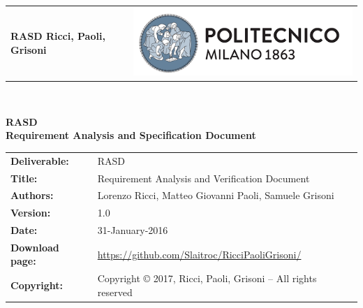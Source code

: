 \documentclass [11pt,twoside]{article}
\begin{document}
    \begin{titlepage}
    
        {\begin{table}[t!]
        \centering
        \begin{tabu} to \textwidth { X[1.3,r,p] X[1.7,l,p] }
        \textcolor{titleColor}
        {\textbf{\small{RASD Ricci, Paoli, Grisoni}}} & \includegraphics[scale=0.5]{Images/PolimiLogo}
        \end{tabu}
        \end{table}}~\\ [6cm]
        
        \begin{center}
        {\textcolor{titleColor}{\textbf{\Huge{RASD}\\ \vspace{2ex} \Huge{Requirement Analysis and Specification Document}}}} \\ [1cm]
        \end{center}
    
    \end{titlepage}
    
    \begin{table}[h!]
        \begin{tabu} to \textwidth { X[0.3,r,p] X[0.7,l,p] }
            \hline
            \textbf{Deliverable:} & RASD\\
            \textbf{Title:} & Requirement Analysis and Verification Document \\
            \textbf{Authors:} & Lorenzo Ricci, Matteo Giovanni Paoli, Samuele Grisoni \\
            \textbf{Version:} & 1.0 \\ 
            \textbf{Date:} & 31-January-2016 \\
            \textbf{Download page:} & \url{https://github.com/Slaitroc/RicciPaoliGrisoni/} \\
            \textbf{Copyright:} & Copyright © 2017, Ricci, Paoli, Grisoni – All rights reserved \\
            \hline
        \end{tabu}
    \end{table}
    
\end{document}
